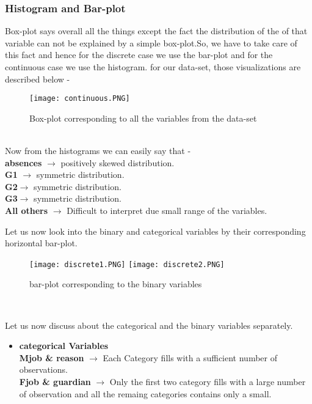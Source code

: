 \documentclass[A4paper,11pt]{report}
\begin{document}
	\subsubsection{Histogram and Bar-plot}
	Box-plot says overall all the things except the fact the distribution of the of that variable can not be explained by a simple box-plot.So, we have to take care of this fact and hence for the discrete case we use the bar-plot and for the continuous case we use the histogram. for our data-set, those visualizations are described below -
	\begin{figure}[h!]
		\texttt{[image: continuous.PNG]}
		\caption{Box-plot corresponding to all the variables from the data-set}
	\end{figure}\\
	Now from the histograms we can easily say that - \\
	\textbf{absences} $\rightarrow$ positively skewed distribution.\\
	\textbf{G1} $\rightarrow$ symmetric distribution.\\
	\textbf{G2}$\rightarrow$ symmetric distribution.\\
	\textbf{G3}$\rightarrow$ symmetric distribution.\\
	\textbf{All others} $\rightarrow$ Difficult to interpret due small range of the variables.\\
	\par Let us now look into the binary and categorical variables by their corresponding horizontal bar-plot.
	\begin{figure}[h!]
		\centering
		\texttt{[image: discrete1.PNG]}
		\texttt{[image: discrete2.PNG]}
		\caption{bar-plot corresponding to the binary variables}
	\end{figure}\\
	\par Let us now discuss about the categorical and the binary variables separately.
	\begin{itemize}
		\item \textbf{categorical Variables}\\
		\textbf{Mjob \& reason} $\rightarrow$ Each Category fills with a sufficient number of observations.\\
		\textbf{Fjob \& guardian} $\rightarrow$ Only the first two category fills with a large number of observation and all the remaing categories contains only a small.\\
	\end{itemize}
\end{document}

